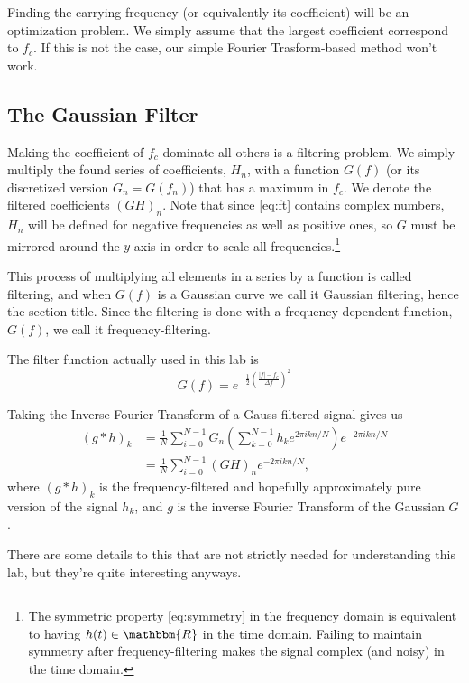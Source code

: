 \documentclass[12pt,a4paper]{article}
\newcommand{\R}{\ensuremath{\mathbbm{R}}}
\begin{document}
Finding the carrying frequency (or equivalently its coefficient) will be
an optimization problem. We simply assume that the largest coefficient
correspond to $f_c$. If this is not the case, our simple Fourier Trasform-based
method won't work.

\subsection{The Gaussian Filter}\label{sec:gauss}
Making the coefficient of $f_c$ dominate all others is a filtering problem.
We simply multiply the found series of coefficients, $H_n$, with a function
$G(f)$ (or its discretized version $G_n = G(f_n)$) that has a maximum in $f_c$.
We denote the filtered coefficients $(GH)_n$.
Note that since \eqref{eq:ft} contains complex numbers, $H_n$ will be defined
for negative frequencies as well as positive ones, so $G$ must be mirrored
around the $y$-axis in order to scale all frequencies.\footnote{The symmetric
  property \eqref{eq:symmetry} in the frequency domain is equivalent
  to having $h(t)\in\R$ in the time domain. Failing to maintain symmetry
  after frequency-filtering makes the signal complex (and noisy) in the time domain.}

This process of multiplying all elements in a series by a function
is called filtering, and when $G(f)$ is a Gaussian curve we
call it Gaussian filtering, hence the section title.
Since the filtering is done with a frequency-dependent function, $G(f)$,
we call it frequency-filtering.

The filter function actually used in this lab is
\begin{equation}\label{eq:filter_fct}
  G(f) = e^{-\frac12\left(\frac{|f| - f_c}{\Delta f} \right)^2}
\end{equation}

Taking the Inverse Fourier Transform of a Gauss-filtered signal gives us
\begin{align}
  (g*h)_k &= \frac1N\sum_{i=0}^{N-1}G_n(\sum_{k=0}^{N-1} h_ke^{2\pi ikn/N})e^{-2\pi ikn/N}\\
          &= \frac1N\sum_{i=0}^{N-1}(GH)_ne^{-2\pi ikn/N},
\end{align}
where $(g*h)_k$ is the frequency-filtered and hopefully approximately pure version of
the signal $h_k$, and $g$ is the inverse Fourier Transform of the Gaussian $G$.

There are some details to this that are not strictly needed for understanding this
lab, but they're quite interesting anyways. 
\end{document}
